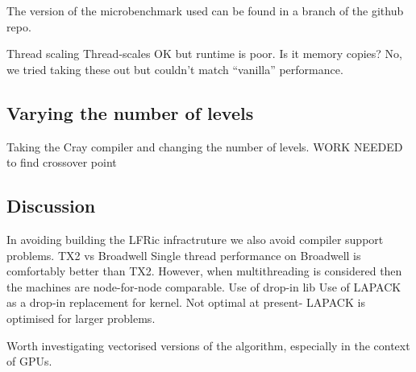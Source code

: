The version of the microbenchmark used can be found in a branch of the github repo.

Thread scaling
Thread-scales OK but runtime is poor.
Is it memory copies? No, we tried taking these out but couldn't match ``vanilla'' performance.

\subsection{Varying the number of levels}
Taking the Cray compiler and changing the number of levels.
WORK NEEDED to find crossover point

\subsection{Discussion}
In avoiding building the LFRic infractruture we also avoid compiler support problems.
TX2 vs Broadwell
Single thread performance on Broadwell is comfortably better than TX2. However, when multithreading is considered then the machines are node-for-node comparable.
Use of drop-in lib
Use of LAPACK as a drop-in replacement for kernel. Not optimal at present- LAPACK is optimised for larger problems.

Worth investigating vectorised versions of the algorithm, especially in the context of GPUs.

